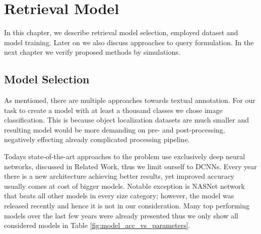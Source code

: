 \chapter{Retrieval Model}

In this chapter, we describe retrieval model selection, employed dataset and model training. Later on we also discuss approaches to query formulation. In the next chapter we verify proposed methods by simulations.

\section{Model Selection}
As mentioned, there are multiple approaches towards textual annotation. For our task to create a model with at least a thousand classes we chose image classification. This is because object localization datasets are much smaller and resulting model would be more demanding on pre- and post-processing, negatively effecting already complicated processing pipeline.

Todays state-of-the-art approaches to the problem use exclusively deep neural networks, discussed in Related Work, thus we limit ourself to DCNNs. Every year there is a new architecture achieving better results, yet improved accuracy usually comes at cost of bigger models. Notable exception is NASNet network~\cite{zoph2017learning} that beats all other models in every size category; however, the model was released recently and hence it is not in our consideration. Many top performing models over the last few years were already presented thus we only show all considered models in Table \ref{fig:model_acc_vs_parameters}.

